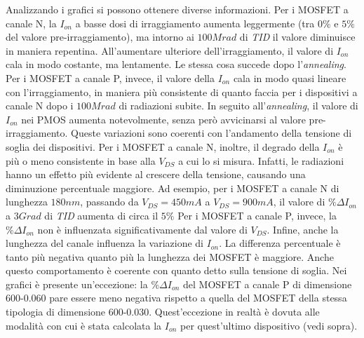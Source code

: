 Analizzando i grafici si possono ottenere diverse informazioni.
Per i MOSFET a canale N, la $I_{on}$ a basse dosi di irraggiamento aumenta leggermente (tra $0\%$ e $5\%$ del valore pre-irraggiamento), ma intorno ai $100 Mrad$ di \emph{TID} il valore diminuisce in maniera repentina. All'aumentare ulteriore dell'irraggiamento, il valore di $I_{on}$ cala in modo costante, ma lentamente. Le stessa cosa succede dopo l'\emph{annealing}. Per i MOSFET a canale P, invece, il valore della $I_{on}$ cala in modo quasi lineare con l'irraggiamento, in maniera più consistente di quanto faccia per i dispositivi a canale N dopo i $100 Mrad$ di radiazioni subite. In seguito all'\emph{annealing}, il valore di $I_{on}$ nei PMOS aumenta notevolmente, senza però avvicinarsi al valore pre-irraggiamento. Queste variazioni sono coerenti con l'andamento della tensione di soglia dei dispositivi. 
Per i MOSFET a canale N, inoltre, il degrado della $I_{on}$ è più o meno consistente in base alla $V_{DS}$ a cui lo si misura. Infatti, le radiazioni hanno un effetto più evidente al crescere della tensione, causando una diminuzione percentuale maggiore. Ad esempio, per i MOSFET a canale N di lunghezza $180 nm$, passando da $V_{DS} = 450mA$ a $V_{DS} = 900 mA$, il valore di $\% \Delta I_{on}$ a $3 Grad$ di \emph{TID} aumenta di circa il $5\%$ Per i MOSFET a canale P, invece, la $\% \Delta I_{on}$ non è influenzata significativamente dal valore di $V_{DS}$.
Infine, anche la lunghezza del canale influenza la variazione di $I_{on}$. La differenza percentuale è tanto più negativa quanto più la lunghezza dei MOSFET è maggiore. Anche questo comportamento è coerente con quanto detto sulla tensione di soglia. Nei grafici è presente un'eccezione: la $\% \Delta I_{on}$ del MOSFET a canale P di dimensione 600-0.060 pare essere meno negativa rispetto a quella del MOSFET della stessa tipologia di dimensione 600-0.030. Quest'eccezione in realtà è dovuta alle modalità con cui è stata calcolata la $I_{on}$ per quest'ultimo dispositivo (vedi sopra).

\FloatBarrier


